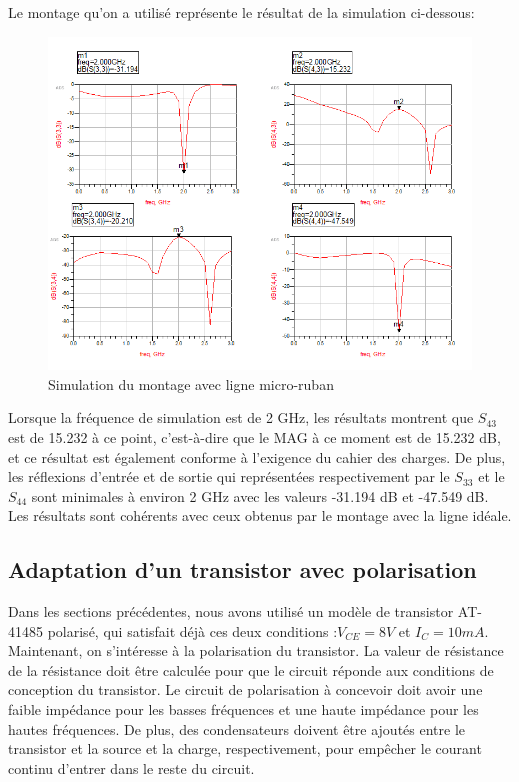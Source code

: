 \documentclass[french]{article}
\begin{document}
Le montage qu’on a utilisé représente le résultat de la simulation ci-dessous:
\begin{figure}[H]
	\centering
	\includegraphics[width=1.2\linewidth]{../5SynthAmp/ligne_micro_ruban_Sparametres}
	\caption{Simulation du montage avec ligne micro-ruban}
	\label{fig:ligne_micro_ruban_Sparametres}
\end{figure}

Lorsque la fréquence de simulation est de 2 GHz, les résultats montrent que $S_{43}$ est de 15.232 à ce point, c'est-à-dire que le MAG à ce moment est de 15.232 dB, et ce résultat est également conforme à l'exigence du cahier des charges. De plus, les réflexions d’entrée et de sortie qui représentées respectivement par le $S_{33}$ et le $S_{44}$ sont minimales à environ 2 GHz avec les valeurs -31.194 dB et -47.549 dB. Les résultats sont cohérents avec ceux obtenus par le montage avec la ligne idéale.

\subsection{Adaptation d’un transistor avec polarisation}
Dans les sections précédentes, nous avons utilisé un modèle de transistor AT-41485 polarisé, qui satisfait déjà ces deux conditions :$V_{CE}=8 V$ et $I_{C}=10 mA$. Maintenant, on s’intéresse à la polarisation du transistor. La valeur de résistance de la résistance doit être calculée pour que le circuit réponde aux conditions de conception du transistor. Le circuit de polarisation à concevoir doit avoir une faible impédance pour les basses fréquences et une haute impédance pour les hautes fréquences. De plus, des condensateurs doivent être ajoutés entre le transistor et la source et la charge, respectivement, pour empêcher le courant continu d'entrer dans le reste du circuit.
\end{document}
